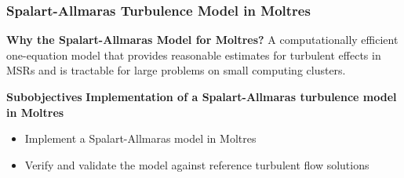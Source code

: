 \begin{frame}
  \frametitle{Spalart-Allmaras Turbulence Model in Moltres}
  \begin{block}{\textbf{Why the Spalart-Allmaras Model for Moltres?}}
    A computationally efficient one-equation model that provides reasonable estimates for turbulent
    effects in MSRs and is tractable for large problems on small computing clusters.
  \end{block}
  \begin{block}{\textbf{Subobjectives}}
    \textbf{Implementation of a Spalart-Allmaras turbulence model in Moltres}
    \begin{itemize}
      \item Implement a Spalart-Allmaras model in Moltres
      \item Verify and validate the model against reference turbulent flow solutions
    \end{itemize}
  \end{block}
\end{frame}

